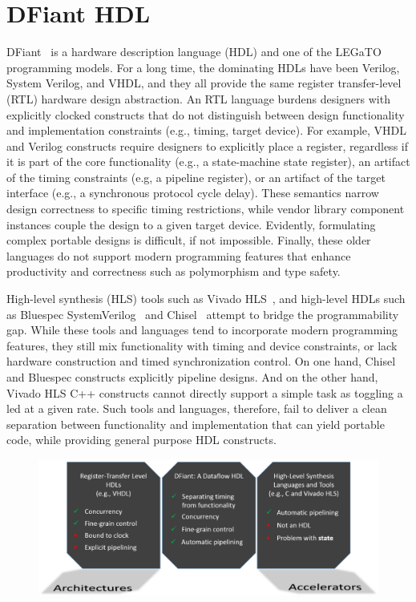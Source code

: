\section{DFiant HDL}
DFiant~\cite{Port2017} is a hardware description language (HDL) and one of the LEGaTO programming models. For a long time, the dominating HDLs have been Verilog, System Verilog, and VHDL, and they all provide the same register transfer-level (RTL) hardware design abstraction. An RTL language burdens designers with explicitly clocked constructs that do not distinguish between design functionality and implementation constraints (e.g., timing, target device).
For example, VHDL and Verilog constructs require designers to explicitly place a register, regardless if it is part of the core functionality (e.g., a state-machine state register), an artifact of the timing constraints (e.g, a pipeline register), or an artifact of the target interface (e.g., a synchronous protocol cycle delay). These semantics narrow design correctness to specific timing restrictions, while vendor library component instances couple the design to a given target device. Evidently, formulating complex portable designs is difficult, if not impossible. Finally, these older languages do not support modern programming features that enhance productivity and correctness such as polymorphism and type safety.

High-level synthesis (HLS) tools such as Vivado HLS~\cite{Vivado2012}, and high-level HDLs such as Bluespec SystemVerilog~\cite{nikhil2004bluespec} and Chisel~\cite{Bachrach2012} attempt to bridge the programmability gap.
While these tools and languages tend to incorporate modern programming features, they still mix functionality with timing and device constraints, or lack hardware construction and timed synchronization control. On one hand, Chisel and Bluespec constructs explicitly pipeline designs. And on the other hand, Vivado HLS C++ constructs cannot directly support a simple task as toggling a led at a given rate.
Such tools and languages, therefore, fail to deliver a clean separation between functionality and implementation that can yield portable code, while providing general purpose HDL constructs. 

\begin{figure}[h]

\centering

\includegraphics[scale=0.2]{graphics/prog_gaps.png} 


\label{fig:prog_gaps}

\end{figure}

